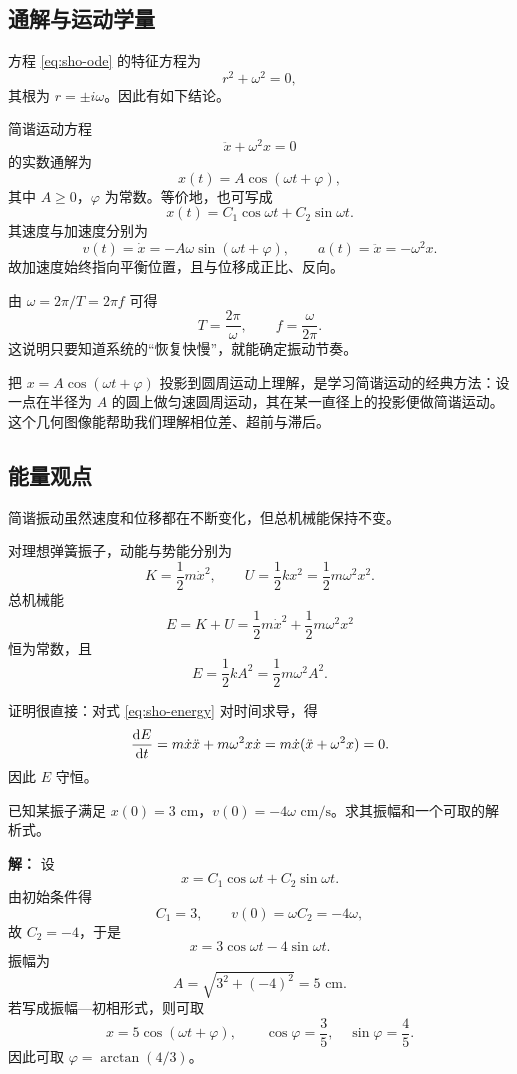 \subsection{通解与运动学量}

方程 \eqref{eq:sho-ode} 的特征方程为
\[
r^2+\omega^2=0,
\]
其根为 $r=\pm i\omega$。因此有如下结论。

\begin{theorem}
简谐运动方程
\[
\ddot x+\omega^2x=0
\]
的实数通解为
\begin{equation}
 x(t)=A\cos(\omega t+\varphi),
\label{eq:sho-general}
\end{equation}
其中 $A\ge 0$，$\varphi$ 为常数。等价地，也可写成
\[
 x(t)=C_1\cos \omega t+C_2\sin \omega t.
\]
其速度与加速度分别为
\[
 v(t)=\dot x=-A\omega\sin(\omega t+\varphi),
\qquad
 a(t)=\ddot x=-\omega^2x.
\]
故加速度始终指向平衡位置，且与位移成正比、反向。
\end{theorem}

由 $\omega=2\pi/T=2\pi f$ 可得
\[
T=\frac{2\pi}{\omega},
\qquad
f=\frac{\omega}{2\pi}.
\]
这说明只要知道系统的“恢复快慢”，就能确定振动节奏。

\begin{remark}
把 $x=A\cos(\omega t+\varphi)$ 投影到圆周运动上理解，是学习简谐运动的经典方法：设一点在半径为 $A$ 的圆上做匀速圆周运动，其在某一直径上的投影便做简谐运动。这个几何图像能帮助我们理解相位差、超前与滞后。
\end{remark}

\subsection{能量观点}

简谐振动虽然速度和位移都在不断变化，但总机械能保持不变。

\begin{law}
对理想弹簧振子，动能与势能分别为
\[
K=\frac12 m\dot x^2,
\qquad
U=\frac12 kx^2=\frac12 m\omega^2x^2.
\]
总机械能
\begin{equation}
E=K+U=\frac12 m\dot x^2+\frac12 m\omega^2x^2
\label{eq:sho-energy}
\end{equation}
恒为常数，且
\[
E=\frac12 kA^2=\frac12 m\omega^2A^2.
\]
\end{law}

证明很直接：对式 \eqref{eq:sho-energy} 对时间求导，得
\[
\dv{E}{t}=m\dot x\ddot x+m\omega^2x\dot x
= m\dot x(\ddot x+\omega^2x)=0.
\]
因此 $E$ 守恒。

\begin{example}
已知某振子满足 $x(0)=3\text{ cm}$，$v(0)=-4\omega\text{ cm/s}$。求其振幅和一个可取的解析式。

\textbf{解：} 设
\[
x=C_1\cos\omega t+C_2\sin\omega t.
\]
由初始条件得
\[
C_1=3,
\qquad
v(0)=\omega C_2=-4\omega,
\]
故 $C_2=-4$，于是
\[
x=3\cos\omega t-4\sin\omega t.
\]
振幅为
\[
A=\sqrt{3^2+(-4)^2}=5\text{ cm}.
\]
若写成振幅—初相形式，则可取
\[
x=5\cos(\omega t+\varphi),
\qquad
\cos\varphi=\frac35,
\quad
\sin\varphi=\frac45.
\]
因此可取 $\varphi=\arctan(4/3)$。
\end{example}

